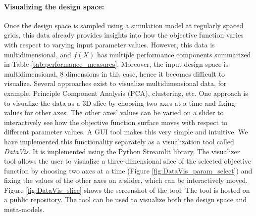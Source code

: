\paragraph{Visualizing the design space:} 
Once the design space is sampled using a simulation model at regularly spaced grids, this data already provides insights into how the objective function varies with respect to varying input parameter values. However, this data is multidimensional, and $f(X)$ has multiple performance components summarized in Table \ref{tab:performance_measures}. Moreover, the input design space is multidimensional, 8 dimensions in this case, hence it becomes difficult to visualize. Several approaches exist to visualize multidimensional data, for example, Principle Component Analysis (PCA), clustering, etc. One approach is to visualize the data as a 3D slice by choosing two axes at a time and fixing values for other axes. The other axes' values can be varied on a slider to interactively see how the objective function surface moves with respect to different parameter values. A GUI tool makes this very simple and intuitive. We have implemented this functionality separately as a visualization tool called \textit{DataVis}. It is implemented using the Python Streamlit library. The visualizer tool allows the user to visualize a three-dimensional slice of the selected objective function by choosing two axes at a time (Figure \ref{fig:DataVis_param_select}) and fixing the values of the other axes on a slider, which can be interactively moved. Figure \ref{fig:DataVis_slice} shows the screenshot of the tool. The tool is hosted on a public repository. The tool can be used to visualize both the design space and meta-models.

